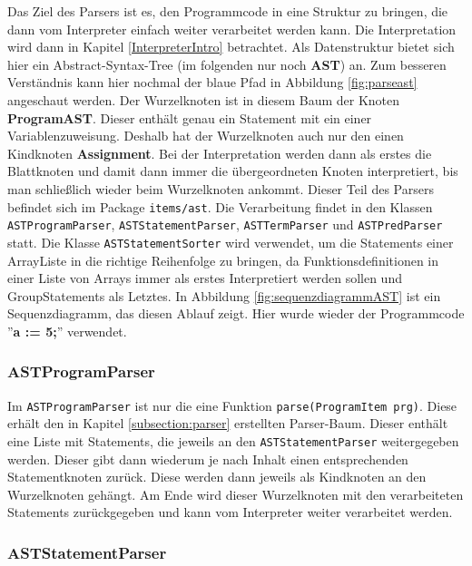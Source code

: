 Das Ziel des Parsers ist es, den Programmcode in eine Struktur zu bringen, die dann vom Interpreter einfach weiter verarbeitet werden kann. Die Interpretation wird dann in Kapitel \ref{InterpreterIntro} betrachtet.
Als Datenstruktur bietet sich hier ein Abstract-Syntax-Tree (im folgenden nur noch \textbf{AST}) an. Zum besseren Verständnis kann hier nochmal der blaue Pfad in Abbildung \ref{fig:parseast} angeschaut werden. Der Wurzelknoten ist in diesem Baum der Knoten \textbf{ProgramAST}. 
Dieser enthält genau ein Statement mit ein einer Variablenzuweisung. Deshalb hat der Wurzelknoten auch nur den einen Kindknoten \textbf{Assignment}. 
Bei der Interpretation werden dann als erstes die Blattknoten und damit dann immer die übergeordneten Knoten interpretiert, bis man schließlich wieder beim Wurzelknoten ankommt. 
\newline
\newline
Dieser Teil des Parsers befindet sich im Package \texttt{items/ast}. Die Verarbeitung findet in den Klassen \texttt{ASTProgramParser}, \texttt{ASTStatementParser}, \texttt{ASTTermParser} und \texttt{ASTPredParser} statt. Die Klasse \texttt{ASTStatementSorter} wird verwendet, um die Statements einer ArrayListe in die richtige Reihenfolge zu bringen, da Funktionsdefinitionen in einer Liste von Arrays immer als erstes Interpretiert werden sollen und GroupStatements als Letztes.
\newline
\newline
In Abbildung \ref{fig:sequenzdiagrammAST} ist ein Sequenzdiagramm, das diesen Ablauf zeigt. Hier wurde wieder der Programmcode ''\textbf{a := 5;}'' verwendet.

\subsubsection{ASTProgramParser}

Im \texttt{ASTProgramParser} ist nur die eine Funktion \texttt{parse(ProgramItem prg)}. Diese erhält den in Kapitel \ref{subsection:parser} erstellten Parser-Baum. 
Dieser enthält eine Liste mit Statements, die jeweils an den \texttt{ASTStatementParser} weitergegeben werden. Dieser gibt dann wiederum je nach Inhalt einen entsprechenden Statementknoten zurück. Diese werden dann jeweils als Kindknoten an den Wurzelknoten gehängt. 
Am Ende wird dieser Wurzelknoten mit den verarbeiteten Statements zurückgegeben und kann vom Interpreter weiter verarbeitet werden.

\subsubsection{ASTStatementParser}

